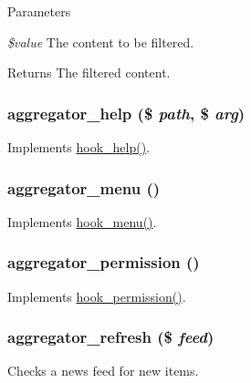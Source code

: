 \begin{DoxyParams}{Parameters}
\item[{\em \$value}]The content to be filtered.\end{DoxyParams}
\begin{DoxyReturn}{Returns}
The filtered content. 
\end{DoxyReturn}
\hypertarget{aggregator_8module_a1b16201821780d636825810bbab7c8b9}{
\subsubsection[{aggregator\_\-help}]{\setlength{\rightskip}{0pt plus 5cm}aggregator\_\-help (\$ {\em path}, \/  \$ {\em arg})}}
\label{aggregator_8module_a1b16201821780d636825810bbab7c8b9}
Implements \hyperlink{group__hooks_ga5589c2714a782738e8851c4c90231f0e}{hook\_\-help()}. \hypertarget{aggregator_8module_a18d55253ab5538426a4fc6d20b672dda}{
\subsubsection[{aggregator\_\-menu}]{\setlength{\rightskip}{0pt plus 5cm}aggregator\_\-menu ()}}
\label{aggregator_8module_a18d55253ab5538426a4fc6d20b672dda}
Implements \hyperlink{group__hooks_ga5c95244fea59b25666e409759e133ded}{hook\_\-menu()}. \hypertarget{aggregator_8module_a1cb2d5a4e95cc6f7e9ecba9859b86e71}{
\subsubsection[{aggregator\_\-permission}]{\setlength{\rightskip}{0pt plus 5cm}aggregator\_\-permission ()}}
\label{aggregator_8module_a1cb2d5a4e95cc6f7e9ecba9859b86e71}
Implements \hyperlink{group__hooks_ga2b22b45f4925f2478412477bae329713}{hook\_\-permission()}. \hypertarget{aggregator_8module_ac33f2d56e676554c7f10a56b05c646f7}{
\subsubsection[{aggregator\_\-refresh}]{\setlength{\rightskip}{0pt plus 5cm}aggregator\_\-refresh (\$ {\em feed})}}
\label{aggregator_8module_ac33f2d56e676554c7f10a56b05c646f7}
Checks a news feed for new items.


